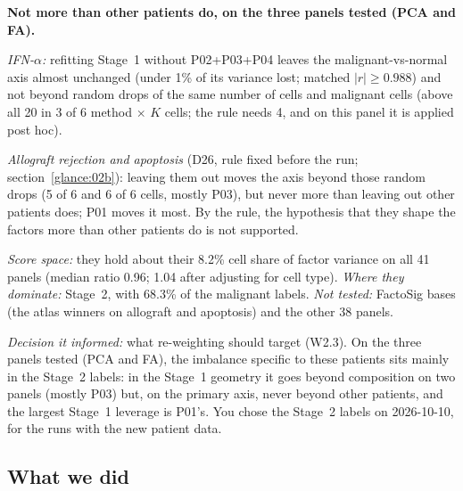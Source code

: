 \begin{answerbox}
\textbf{Not more than other patients do, on the three panels tested (PCA and FA).}
\par\smallskip\noindent \emph{IFN-$\alpha$:} refitting Stage~1 without P02+P03+P04 leaves the malignant-vs-normal axis almost unchanged (under 1\% of its variance lost; matched $|r| \geq 0.988$) and not beyond random drops of the same number of cells and malignant cells (above all 20 in 3 of 6 method $\times$ $K$ cells; the rule needs 4, and on this panel it is applied post hoc).
\par\smallskip\noindent \emph{Allograft rejection and apoptosis} (D26, rule fixed before the run; section~\ref{glance:02b}): leaving them out moves the axis beyond those random drops (5 of 6 and 6 of 6 cells, mostly P03), but never more than leaving out other patients does; P01 moves it most. By the rule, the hypothesis that they shape the factors more than other patients do is not supported.
\par\smallskip\noindent \emph{Score space:} they hold about their 8.2\% cell share of factor variance on all 41 panels (median ratio 0.96; 1.04 after adjusting for cell type). \emph{Where they dominate:} Stage~2, with 68.3\% of the malignant labels. \emph{Not tested:} FactoSig bases (the atlas winners on allograft and apoptosis) and the other 38 panels.
\par\smallskip\noindent \emph{Decision it informed:} what re-weighting should target (W2.3). On the three panels tested (PCA and FA), the imbalance specific to these patients sits mainly in the Stage~2 labels: in the Stage~1 geometry it goes beyond composition on two panels (mostly P03) but, on the primary axis, never beyond other patients, and the largest Stage~1 leverage is P01's. You chose the Stage~2 labels on 2026-10-10, for the runs with the new patient data.
\end{answerbox}

\subsection*{What we did}

